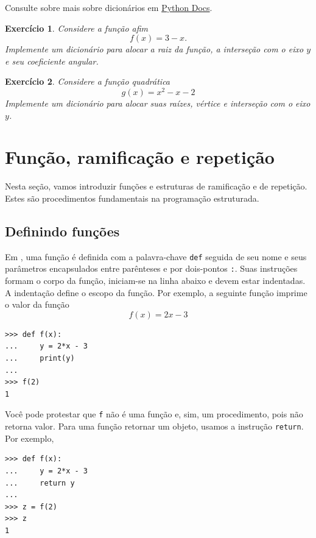 \documentclass[12pt]{article}
\newtheorem{exr}{Exercício}[section]
\begin{document}
\begin{obs}
  Consulte sobre mais sobre dicionários em \href{https://docs.python.org/3/tutorial/datastructures.html#dictionaries}{Python Docs}.
\end{obs}

\begin{exr}
  Considere a função afim
  \begin{equation}
    f(x) = 3 - x.
  \end{equation}
  Implemente um dicionário para alocar a raiz da função, a interseção com o eixo $y$ e seu coeficiente angular.
\end{exr}

\begin{exr}
  Considere a função quadrática
  \begin{equation}
    g(x) = x^2 - x - 2
  \end{equation}
  Implemente um dicionário para alocar suas raízes, vértice e interseção com o eixo $y$.
\end{exr}

\section{Função, ramificação e repetição}\label{sec_fun}

Nesta seção, vamos introduzir funções e estruturas de ramificação e de repetição. Estes são procedimentos fundamentais na programação estruturada.

\subsection{Definindo funções}

Em {\python}, uma função é definida com a palavra-chave \lstinline+def+ seguida de seu nome e seus parâmetros encapsulados entre parênteses e por dois-pontos \lstinline+:+. Suas instruções formam o corpo da função, iniciam-se na linha abaixo e devem estar indentadas. A indentação define o escopo da função. Por exemplo, a seguinte função imprime o valor da função
\begin{equation}
  f(x) = 2x - 3
\end{equation}
\begin{lstlisting}
>>> def f(x):
...     y = 2*x - 3
...     print(y)
... 
>>> f(2)
1
\end{lstlisting}
Você pode protestar que \lstinline+f+ não é uma função e, sim, um procedimento, pois não retorna valor. Para uma função retornar um objeto, usamos a instrução \lstinline+return+. Por exemplo,
\begin{lstlisting}
>>> def f(x):
...     y = 2*x - 3
...     return y
... 
>>> z = f(2)
>>> z
1
\end{lstlisting}
\end{document}
